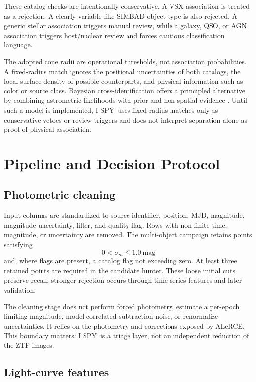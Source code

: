 \documentclass[11pt]{article}
\newcommand{\project}{I SPY}
\begin{document}
These catalog checks are intentionally conservative. A VSX association is treated as a rejection. A clearly variable-like SIMBAD object type is also rejected. A generic stellar association triggers manual review, while a galaxy, QSO, or AGN association triggers host/nuclear review and forces cautious classification language.

The adopted cone radii are operational thresholds, not association probabilities. A fixed-radius match ignores the positional uncertainties of both catalogs, the local surface density of possible counterparts, and physical information such as color or source class. Bayesian cross-identification offers a principled alternative by combining astrometric likelihoods with prior and non-spatial evidence \citep{budavari2008}. Until such a model is implemented, \project\ uses fixed-radius matches only as conservative vetoes or review triggers and does not interpret separation alone as proof of physical association.

\section{Pipeline and Decision Protocol}
\label{sec:methods}

\subsection{Photometric cleaning}

Input columns are standardized to source identifier, position, MJD, magnitude, magnitude uncertainty, filter, and quality flag. Rows with non-finite time, magnitude, or uncertainty are removed. The multi-object campaign retains points satisfying
\begin{equation}
  0 < \sigma_m \leq 1.0~\mathrm{mag}
\end{equation}
and, where flags are present, a catalog flag not exceeding zero. At least three retained points are required in the candidate hunter. These loose initial cuts preserve recall; stronger rejection occurs through time-series features and later validation.

The cleaning stage does not perform forced photometry, estimate a per-epoch limiting magnitude, model correlated subtraction noise, or renormalize uncertainties. It relies on the photometry and corrections exposed by ALeRCE. This boundary matters: \project\ is a triage layer, not an independent reduction of the ZTF images.

\subsection{Light-curve features}
\end{document}
